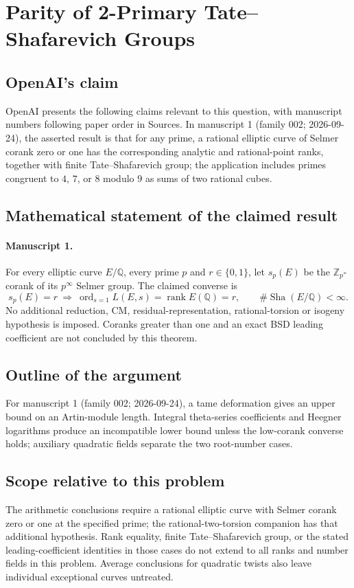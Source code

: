 \documentclass[11pt]{article}
\begin{document}
\section*{Parity of 2-Primary Tate–Shafarevich Groups}

\subsection{OpenAI's claim}
OpenAI presents the following claims relevant to this question, with manuscript numbers following paper order in Sources. In manuscript 1 (family 002; 2026-09-24), the asserted result is that for any prime, a rational elliptic curve of Selmer corank zero or one has the corresponding analytic and rational-point ranks, together with finite Tate--Shafarevich group; the application includes primes congruent to $4$, $7$, or $8$ modulo $9$ as sums of two rational cubes.

\subsection{Mathematical statement of the claimed result}
\paragraph{Manuscript 1.}
For every elliptic curve $E/\mathbb Q$, every prime $p$ and $r\in\{0,1\}$, let $s_p(E)$ be the $\mathbb Z_p$-corank of its $p^{\infty}$ Selmer group. The claimed converse is
\[
 s_p(E)=r\ \Longrightarrow\ \operatorname{ord}_{s=1}L(E,s)=\operatorname{rank}E(\mathbb Q)=r,
 \qquad\#\operatorname{Sha}(E/\mathbb Q)<\infty.
\]
No additional reduction, CM, residual-representation, rational-torsion or isogeny hypothesis is imposed. Coranks greater than one and an exact BSD leading coefficient are not concluded by this theorem.

\subsection{Outline of the argument}
For manuscript 1 (family 002; 2026-09-24), a tame deformation gives an upper bound on an Artin-module length. Integral theta-series coefficients and Heegner logarithms produce an incompatible lower bound unless the low-corank converse holds; auxiliary quadratic fields separate the two root-number cases.

\subsection{Scope relative to this problem}
The arithmetic conclusions require a rational elliptic curve with Selmer corank zero or one at the specified prime; the rational-two-torsion companion has that additional hypothesis. Rank equality, finite Tate--Shafarevich group, or the stated leading-coefficient identities in those cases do not extend to all ranks and number fields in this problem. Average conclusions for quadratic twists also leave individual exceptional curves untreated.
\end{document}
